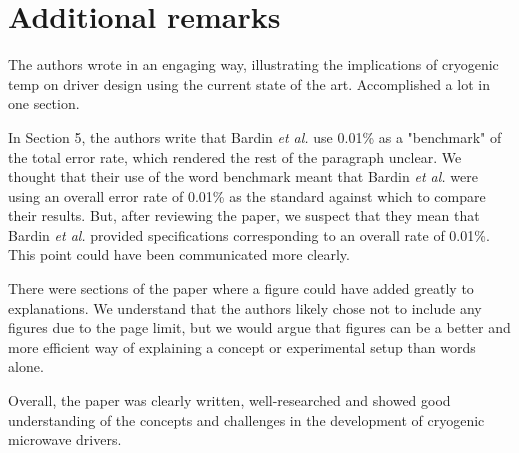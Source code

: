 \documentclass[11pt]{article}
\begin{document}
\section{Additional remarks}
\label{sec:org6656e70}
The authors wrote in an engaging way, illustrating the implications of cryogenic
temp on driver design using the current state of the art. Accomplished a lot in
one section.

In Section 5, the authors write that Bardin \emph{et al.} use 0.01\% as a
"benchmark" of the total error rate, which rendered the rest of the
paragraph unclear. We thought that their use of the word benchmark
meant that Bardin \emph{et al.} were using an overall error rate of 0.01\% as
the standard against which to compare their results. But, after
reviewing the paper, we suspect that they mean that Bardin \emph{et al.}
provided specifications corresponding to an overall rate of 0.01\%.
This point could have been communicated more clearly. 

There were sections of the paper where a figure could have
added greatly to explanations. We understand that the authors likely
chose not to include any figures due to the page limit, but we would
argue that figures can be a better and more efficient way of
explaining a concept or experimental setup than words alone.

Overall, the paper was clearly written, well-researched and showed
good understanding of the concepts and challenges in the development
of cryogenic microwave drivers.
\end{document}
